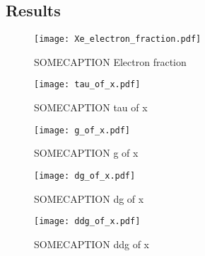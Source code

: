 \subsection{Results}\label{sec:m2:results} 



    \begin{figure}
        \texttt{[image: Xe\_electron\_fraction.pdf]}
        \caption{SOMECAPTION Electron fraction}
        \label{fig:m2:electron_fraction_Xe}
    \end{figure}


    \begin{figure}
        \texttt{[image: tau\_of\_x.pdf]}
        \caption{SOMECAPTION tau of x}
        \label{fig:m2:tau_of_x}
    \end{figure}


    \begin{figure}
        \texttt{[image: g\_of\_x.pdf]}
        \caption{SOMECAPTION g of x}
        \label{fig:m2:g_of_x}
    \end{figure}

    \begin{figure}
        \texttt{[image: dg\_of\_x.pdf]}
        \caption{SOMECAPTION dg of x}
        \label{fig:m2:dg_of_x}
    \end{figure}

    \begin{figure}
        \texttt{[image: ddg\_of\_x.pdf]}
        \caption{SOMECAPTION ddg of x}
        \label{fig:m2:ddg_of_x}
    \end{figure}

